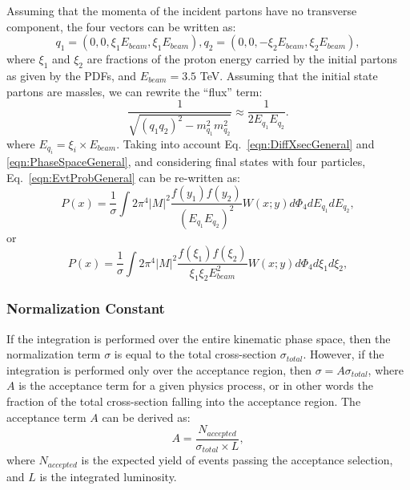 Assuming that  the momenta of the incident partons have no transverse component, the four vectors can be written as:
\begin{equation}
q_{1}=(0,0,\xi_{1}E_{beam},\xi_{1}E_{beam}),
q_{2}=(0,0,-\xi_{2}E_{beam},\xi_{2}E_{beam}),
\label{eqn:EvtProbGeneral2}  
\end{equation}
where $\xi_{1}$ and $\xi_{2}$ are fractions of the proton energy carried by the initial partons as given by the PDFs, and
$E_{beam}=3.5$ TeV. Assuming that the initial state partons are massles, we can rewrite the ``flux'' term:
\begin{equation}
\frac{1}{\sqrt{(q_{1}q_{2})^{2}-m_{q_{1}}^{2}m_{q_{2}}^{2}}} \approx \frac{1}{2 E_{q_{1}}E_{q_{2}}}.
\label{eqn:flux}  
\end{equation}
where $E_{q_{i}} = \xi_i\times E_{beam}$.  
Taking into account Eq.~\ref{eqn:DiffXsecGeneral} and \ref{eqn:PhaseSpaceGeneral}, and considering final states with four particles,
Eq.~\ref{eqn:EvtProbGeneral} can be re-written as:
\begin{equation}
P(x)=\frac{1}{ \sigma}\int 2 \pi^{4} \left| M \right|^{2} \frac{f(y_{1})f(y_{2})}{(E_{q_{1}}E_{q_{2}})^{2}}W(x;y)d\Phi_{4}dE_{q_{1}}dE_{q_{2}},
\label{eqn:EvtProbGeneral3}  
\end{equation}
or
\begin{equation}
P(x)=\frac{1}{\sigma }\int 2 \pi^{4} \left| M \right|^{2} \frac{f(\xi_{1})f(\xi_{2})}{\xi_{1}\xi_{2}E_{beam}^{2}}W(x;y)d\Phi_{4}d\xi_{1}d\xi_{2},
\label{eqn:EvtProbGeneral4}  
\end{equation}

\subsubsection{Normalization Constant}
If the integration is performed over the entire kinematic phase space, then the normalization term $\sigma$ is equal
to the total cross-section $\sigma_{total}$.  However, if the integration is performed only over the acceptance region,
then $\sigma=A\sigma_{total}$, where $A$ is the acceptance term for a given physics process, or in other words the fraction
of the total cross-section falling into the acceptance region.  The acceptance term $A$ can be derived as:
\begin{equation}
A=\frac{N_{accepted}}{\sigma_{total}\times L},
\label{eqn:Acceptance}  
\end{equation}
where $N_{accepted}$ is the expected yield of events passing the acceptance selection, and $L$ is the integrated luminosity.

